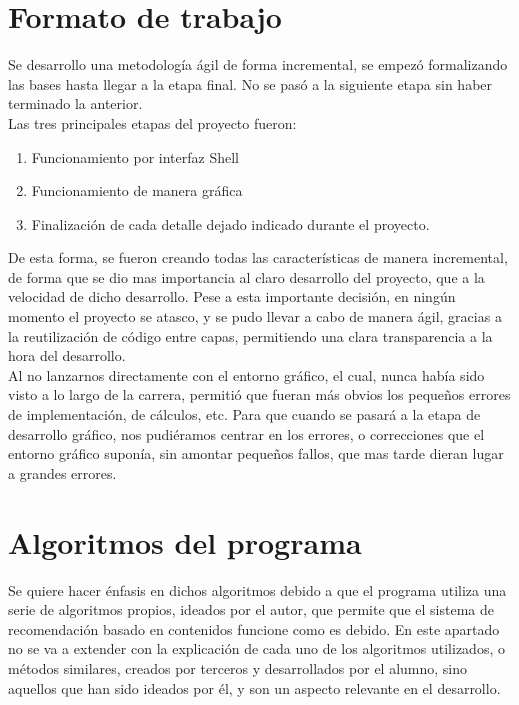 \section{Formato de trabajo}
Se desarrollo una metodología ágil de forma incremental, se empezó formalizando las bases hasta llegar a la etapa final. No se pasó a la siguiente etapa sin haber terminado la anterior.\\

Las tres principales etapas del proyecto fueron:
\begin{enumerate}
\item	Funcionamiento por interfaz Shell
\item	Funcionamiento de manera gráfica
\item	Finalización de cada detalle dejado indicado durante el proyecto.
\end{enumerate}

De esta forma, se fueron creando todas las características de manera incremental, de forma que se dio mas importancia al claro desarrollo del proyecto, que a la velocidad de dicho desarrollo. Pese a esta importante decisión, en ningún momento el proyecto se atasco, y se pudo llevar a cabo de manera ágil, gracias a la reutilización de código entre capas, permitiendo una clara transparencia a la hora del desarrollo.\\

Al no lanzarnos directamente con el entorno gráfico, el cual, nunca había sido visto a lo largo de la carrera, permitió que fueran más obvios los pequeños errores de implementación, de cálculos, etc. Para que cuando se pasará a la etapa de desarrollo gráfico, nos pudiéramos centrar en los errores, o correcciones que el entorno gráfico suponía, sin amontar pequeños fallos, que mas tarde dieran lugar a grandes errores.\\

\section{Algoritmos del programa}
Se quiere hacer énfasis en dichos algoritmos debido a que el programa utiliza una serie de algoritmos propios, ideados por el autor, que permite que el sistema de recomendación basado en contenidos funcione como es debido. En este apartado no se va a extender con la explicación de cada uno de los algoritmos utilizados, o métodos similares, creados por terceros y desarrollados por el alumno, sino aquellos que han sido ideados por él, y son un aspecto relevante en el desarrollo.
